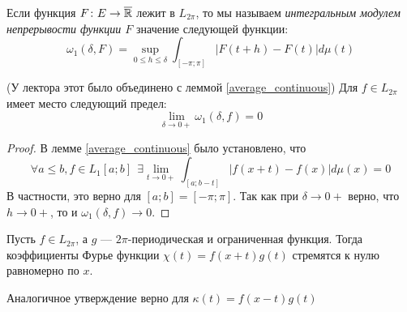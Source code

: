\begin{definition}
	Если функция $F \colon E \to \overline{\mathbb{R}}$ лежит в $L_{2\pi}$, то мы называем \textit{интегральным модулем непрерывости функции $F$} значение следующей функции:
	\[
		\omega_1(\delta, F) = \sup_{0 \le h \le \delta} \int_{[-\pi; \pi]} |F(t + h) - F(t)|d\mu(t)
	\]
\end{definition}

\begin{lemma} (У лектора этот было объединено с леммой \ref{average_continuous})
	Для $f \in L_{2\pi}$ имеет место следующий предел:
	\[
		\lim_{\delta \to 0+} \omega_1(\delta, f) = 0
	\]
\end{lemma}

\begin{proof}
	В лемме \ref{average_continuous} было установлено, что
	\[
		\forall a \le b, f \in L_1[a; b]\ \ \exists \lim_{t \to 0+} \int_{[a; b - t]} |f(x + t) - f(x)|d\mu(x) = 0
	\]
	В частности, это верно для $[a; b] = [-\pi; \pi]$. Так как при $\delta \to 0+$ верно, что $h \to 0+$, то и $\omega_1(\delta, f) \to 0$.
\end{proof}

\begin{lemma}
	Пусть $f \in L_{2\pi}$, а $g$ --- $2\pi$-периодическая и ограниченная функция. Тогда коэффициенты Фурье функции $\chi(t) = f(x + t)g(t)$ стремятся к нулю равномерно по $x$.
\end{lemma}

\begin{note}
	Аналогичное утверждение верно для $\kappa(t) = f(x - t)g(t)$
\end{note}

